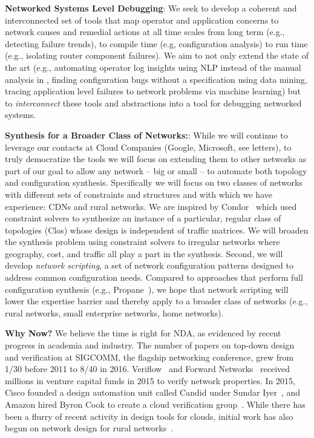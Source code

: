 {\bf Networked Systems Level Debugging}:  We seek to develop a coherent and interconnected set of tools that map operator and application concerns  to network causes and remedial actions at all time scales from  long term (e.g., detecting failure trends), to compile time (e.g,
configuration analysis) to run time (e.g., isolating router component failures).  We aim to
not only extend the state of the art  (e.g., automating operator log insights using NLP instead of
the manual analysis in \cite{rameshgoogle}, finding configuration bugs without a specification
using data mining, tracing application level failures to network problems via machine learning)
but to \emph{interconnect} these tools and abstractions into a tool for debugging networked
systems.

{\bf Synthesis for a Broader Class of Networks:}: While we will continue to leverage our contacts at Cloud Companies (Google, Microsoft, see letters), to truly democratize the tools we will focus on extending them to other networks as part of our goal to allow any network -- big or small -- to automate both topology and configuration synthesis.  Specifically we will focus on two classes of networks with different sets of constraints and structures and with which we have experience:  CDNs and rural networks.
We are inspired by Condor~\cite{condor} which used constraint solvers to synthesize an instance of a particular, regular class of topologies (Clos) whose design is independent of traffic matrices.   We will broaden the synthesis problem using constraint solvers to irregular networks where geography, cost, and traffic all play a part in the synthesis.  Second, we will develop \emph{network scripting}, a set of network configuration patterns designed to address common configuration needs.  Compared to approaches that perform full configuration synthesis (e.g., Propane~\cite{propane}), we hope that network scripting will lower the expertise barrier and thereby apply to a broader class of networks (e.g., rural networks, small enterprise networks, home networks).

{\bf Why Now?} We believe the time is right for NDA, as evidenced by recent progress in academia and industry.  The number of papers on top-down design and verification at SIGCOMM, the flagship networking conference, grew from 1/30 before 2011 to 8/40 in 2016. Veriflow~\cite{veriflow} and Forward Networks~\cite{forward} received millions in venture capital funds in 2015 to verify network properties. In 2015, Cisco founded a design automation unit called Candid under Sundar Iyer~\cite{sundar}, and Amazon hired Byron Cook to create a cloud verification group~\cite{byron}.  While there has been a flurry of recent activity in
design tools for clouds, initial work has also begun on network design for rural
networks~\cite{barathwisp}.




